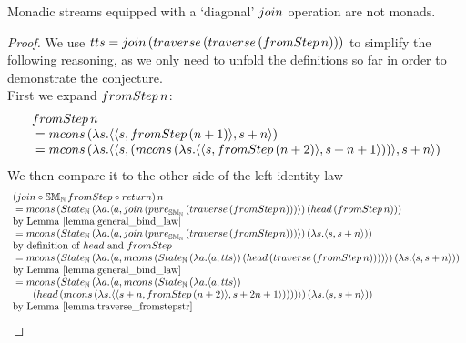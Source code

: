 \begin{theorem}\label{lemma:monad_counterexample}
Monadic streams equipped with a `diagonal' $\join$ operation are not monads.
\end{theorem}
\begin{proof}
We use $tts = \join\, (\mathsf{traverse}\, (\mathsf{traverse}\, (\fromstepstr\, n)))$ to simplify the following reasoning, as we only need to unfold the definitions so far in order to demonstrate the conjecture. \\

First we expand $\fromstepstr\, n$:
$$
\begin{array}{ll}
\fromstepstr\, n \\
{}= \mcons\, (\lambda s. \pair{\pair{s}{\fromstepstr\, (n + 1)}}{s + n})\\
{}= \mcons\, (\lambda s. \pair{\pair{s}{(\mcons\, (\lambda s. \pair{\pair{s}{\fromstepstr\, (n + 2)}}{s + n + 1}))}}{s + n}) \\
\end{array} 
$$
We then compare it to the other side of the left-identity law
$$
\begin{array}{ll}
(\join \comp  \stmon{\nat}\, \fromstepstr \comp \return)\, n \\
{}= \mcons\, (\state_{\nat} \,(\lambda a . \pair{a}{\join\, (\apure_{\stmon{\nat}}\, (\mathsf{traverse}\, (\fromstepstr\, n)))})\, (\head\, (\fromstepstr\, n))) \\
 \mbox{by Lemma \ref{lemma:general_bind_law}}  \\
{}= \mcons\, (\state_{\nat}\,(\lambda a . \pair{a}{\join\, (\apure_{\stmon{\nat}}\,(\mathsf{traverse}\, (\fromstepstr\, n)))})\, (\lambda s. \pair{s}{s + n})) \\
 \mbox{by definition of } \head \mbox{ and } \fromstepstr \\
{}= \mcons\, (\state_{\nat}\,(\lambda a . \pair{a}{  
\mcons\, (\state_{\nat} \,(\lambda a . \pair{a}{tts})\, (\head\, (\mathsf{traverse}\, (\fromstepstr\, n))))
})\, (\lambda s. \pair{s}{s + n})) \\
 \mbox{by Lemma \ref{lemma:general_bind_law}}\\
{}= \mcons\, (\state_{\nat}\,(\lambda a . \pair{a}{  
\mcons\, (\state_{\nat} \,(\lambda a . \pair{a}{tts})\, \\\qquad(\head\, (\mcons\, (\lambda s . \pair{\pair{s+n}{\fromstepstr\, (n + 2)}}{s + 2n + 1}))))
})\, (\lambda s. \pair{s}{s + n})) \\
 \mbox{by Lemma \ref{lemma:traverse_fromstepstr}}\\

\end{array}$$
\end{proof}
